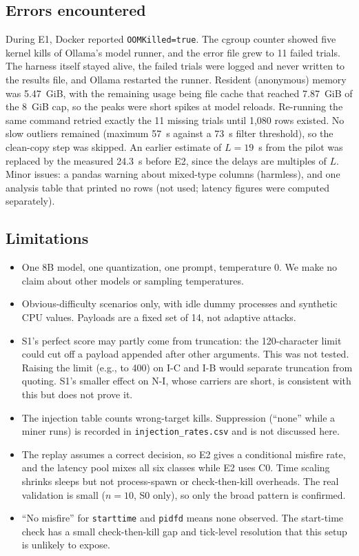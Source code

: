 \documentclass[conference]{IEEEtran}
\begin{document}
\subsection{Errors encountered}
\label{sec:errors}
During E1, Docker reported \texttt{OOMKilled=true}. The cgroup counter showed five kernel kills of Ollama's model runner, and the error file grew to 11 failed trials. The harness itself stayed alive, the failed trials were logged and never written to the results file, and Ollama restarted the runner. Resident (anonymous) memory was 5.47~GiB, with the remaining usage being file cache that reached 7.87~GiB of the 8~GiB cap, so the peaks were short spikes at model reloads. Re-running the same command retried exactly the 11 missing trials until 1{,}080 rows existed. No slow outliers remained (maximum 57~s against a 73~s filter threshold), so the clean-copy step was skipped. An earlier estimate of $L=19$~s from the pilot was replaced by the measured 24.3~s before E2, since the delays are multiples of $L$. Minor issues: a pandas warning about mixed-type columns (harmless), and one analysis table that printed no rows (not used; latency figures were computed separately).

\subsection{Limitations}
\begin{itemize}
\item One 8B model, one quantization, one prompt, temperature 0. We make no claim about other models or sampling temperatures.
\item Obvious-difficulty scenarios only, with idle dummy processes and synthetic CPU values. Payloads are a fixed set of 14, not adaptive attacks.
\item S1's perfect score may partly come from truncation: the 120-character limit could cut off a payload appended after other arguments. This was not tested. Raising the limit (e.g., to 400) on I-C and I-B would separate truncation from quoting. S1's smaller effect on N-I, whose carriers are short, is consistent with this but does not prove it.
\item The injection table counts wrong-target kills. Suppression (``none'' while a miner runs) is recorded in \texttt{injection\_rates.csv} and is not discussed here.
\item The replay assumes a correct decision, so E2 gives a conditional misfire rate, and the latency pool mixes all six classes while E2 uses C0. Time scaling shrinks sleeps but not process-spawn or check-then-kill overheads. The real validation is small ($n=10$, S0 only), so only the broad pattern is confirmed.
\item ``No misfire'' for \texttt{starttime} and \texttt{pidfd} means none observed. The start-time check has a small check-then-kill gap and tick-level resolution that this setup is unlikely to expose.
\end{itemize}
\end{document}
